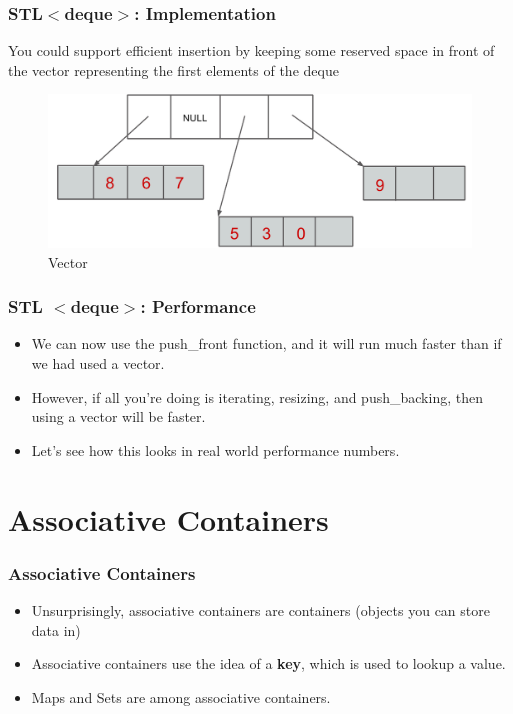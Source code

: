 \documentclass{beamer}
\newtheorem{Key points}{Key points}
\begin{document}
\begin{frame}
  \frametitle{STL$<$deque$>$: Implementation}
You could support efficient insertion by keeping
some reserved space in front of the vector
representing the first elements of the deque
\begin{figure}
  \centering
        \includegraphics[width=0.7\columnwidth]{deq3.png} 
  \caption{Vector }
\end{figure}
\end{frame}

\begin{frame}
\frametitle{STL $<$deque$>$: Performance}
\begin{itemize}
\item We can now use the push\_front function,
and it will run much faster than if we had
used a vector.
\item However, if all you're doing is iterating,
resizing, and push\_backing, then using a
vector will be faster.
\item Let's see how this looks in real world
performance numbers.
\end{itemize}
\end{frame}

\section{Associative Containers}
\begin{frame}
  \frametitle{Associative Containers}
  \begin{itemize}
  \item Unsurprisingly, associative containers are
containers (objects you can store data in)
\item  Associative containers use the idea of a \textbf{key},
which is used to lookup a value.
\item Maps and Sets are among associative containers.
  \end{itemize}
\end{frame}
\end{document}
